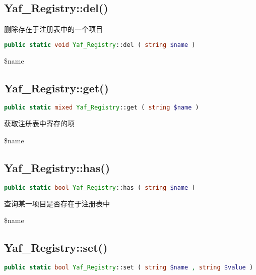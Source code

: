 \subsection{Yaf\_Registry::del()}


删除存在于注册表中的一个项目


\begin{lstlisting}[language=PHP]
public static void Yaf_Registry::del ( string $name )
\end{lstlisting}

\begin{compactitem}
\item \$name
\end{compactitem}



\subsection{Yaf\_Registry::get()}


\begin{lstlisting}[language=PHP]
public static mixed Yaf_Registry::get ( string $name )
\end{lstlisting}

获取注册表中寄存的项

\begin{compactitem}
\item \$name
\end{compactitem}

\subsection{Yaf\_Registry::has()}



\begin{lstlisting}[language=PHP]
public static bool Yaf_Registry::has ( string $name )
\end{lstlisting}

查询某一项目是否存在于注册表中

\begin{compactitem}
\item \$name
\end{compactitem}

\subsection{Yaf\_Registry::set()}


\begin{lstlisting}[language=PHP]
public static bool Yaf_Registry::set ( string $name , string $value )
\end{lstlisting}

